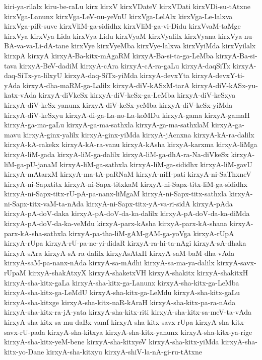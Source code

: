{kiri-ya-rilalx
kiru-be-raLu
kirx
kirxV
kirxVDateV
kirxVDati
kirxVDi-su-tAtxne
kirxVga-Lanunx
kirxVga-LeV-nu-yeVnU
kirxVga-LelAlx
kirxVga-Le-lalxva
kirxVga-piR-suve
kirxVliM-ga-sididhx
kirxVliM-ga-vi-Didu
kirxVvaM-taMge
kirxVya
kirxVya-Lida
kirxVya-Lidu
kirxVyaM
kirxVyalilx
kirxVyana
kirxVya-nu-BA-va-va-Li-dA-tane
kirxVye
kirxVyeMba
kirxVye-lalxva
kirxVyiMda
kirxVyilalx
kirxpA
kirxyA
kirxyA-Ba-kitx-mAgaRM
kirxyA-Ba-si-ta-ga-LeMba
kirxyA-Ba-si-tava
kirxyA-BeV-dadiM
kirxyA-cAra
kirxyA-cA-ra-gaLu
kirxyA-daqSiTx
kirxyA-daq-SiTx-ya-lilxyU
kirxyA-daq-SiTx-yiMda
kirxyA-devxYta
kirxyA-devxY-ti-yAda
kirxyA-dha-maRM-ga-Lalilx
kirxyA-diV-kASxM-tarA
kirxyA-diV-kASx-yu-katx-vAda
kirxyA-diVkeSx
kirxyA-diV-keSx-ga-LeMba
kirxyA-diV-keSxya
kirxyA-diV-keSx-yanunx
kirxyA-diV-keSx-yeMba
kirxyA-diV-keSx-yiMda
kirxyA-diV-keSxyu
kirxyA-di-ga-La-no-La-koMDu
kirxyA-gama
kirxyA-gamaH
kirxyA-ga-ma-gaLu
kirxyA-ga-ma-sathxla
kirxyA-ga-ma-sathxlaM
kirxyA-ga-mavu
kirxyA-ginx-yalilx
kirxyA-ginx-yiMda
kirxyA-jAcnxna
kirxyA-kA-ra-dalilx
kirxyA-kA-rakekx
kirxyA-kA-ra-vanu
kirxyA-kAsha
kirxyA-karxma
kirxyA-liMga
kirxyA-liM-gada
kirxyA-liM-ga-dalilx
kirxyA-liM-ga-dhA-ra-Na-diVkeSx
kirxyA-liM-ga-pU-janaM
kirxyA-liM-ga-sathxla
kirxyA-liM-ga-sididhx
kirxyA-liM-gavU
kirxyA-mAtarxM
kirxyA-ma-tA-paRNaM
kirxyA-niH-pati
kirxyA-ni-SaThxneV
kirxyA-ni-Sapxtitx
kirxyA-ni-Sapx-titxkaM
kirxyA-ni-Sapx-titx-liM-ga-sididhx
kirxyA-ni-Sapx-titx-rU-pA-pa-nanx-liMgaM
kirxyA-ni-Sapx-titx-sathxla
kirxyA-ni-Sapx-titx-vaM-ta-nAda
kirxyA-ni-Sapx-titx-yA-va-ri-sidA
kirxyA-pAda
kirxyA-pA-doV-daka
kirxyA-pA-doV-da-ka-dalilx
kirxyA-pA-doV-da-ka-diMda
kirxyA-pA-doV-da-ka-veMdu
kirxyA-parx-kAsha
kirxyA-parx-kA-shana
kirxyA-parx-kA-sha-sathxla
kirxyA-pa-tha-liM-gAM-gAM-ga-yoVga
kirxyA-rUpA
kirxyA-rUpa
kirxyA-rU-pa-ne-yi-didaR
kirxyA-ra-hi-ta-nAgi
kirxyA-sA-dhaka
kirxyA-sAra
kirxyA-sA-ra-dalilx
kirxyAsAtxH
kirxyA-saM-baM-dha-vAda
kirxyA-saM-pa-nanx-nAda
kirxyA-sa-mAdhi
kirxyA-sa-ma-ya-dalilx
kirxyA-savx-rUpaM
kirxyA-shakAtxyX
kirxyA-shaketxVH
kirxyA-shakitx
kirxyA-shakitxH
kirxyA-sha-kitx-gaLa
kirxyA-sha-kitx-ga-Lanunx
kirxyA-sha-kitx-ga-LeMba
kirxyA-sha-kitx-ga-LeMdU
kirxyA-sha-kitx-ga-LeMdu
kirxyA-sha-kitx-gaLu
kirxyA-sha-kitxge
kirxyA-sha-kitx-naR-kAraH
kirxyA-sha-kitx-pa-ra-nAda
kirxyA-sha-kitx-ra-jA-yata
kirxyA-sha-kitx-riti
kirxyA-sha-kitx-sa-meV-ta-vAda
kirxyA-sha-kitx-sa-mu-daBx-vamf
kirxyA-sha-kitx-savx-rUpa
kirxyA-sha-kitx-savx-rU-pada
kirxyA-sha-kitxya
kirxyA-sha-kitx-yanunx
kirxyA-sha-kitx-ya-rige
kirxyA-sha-kitx-yeM-bene
kirxyA-sha-kitxyeV
kirxyA-sha-kitx-yiMda
kirxyA-sha-kitx-yo-Dane
kirxyA-sha-kitxyu
kirxyA-shiV-la-nA-gi-ru-tAtxne
}
